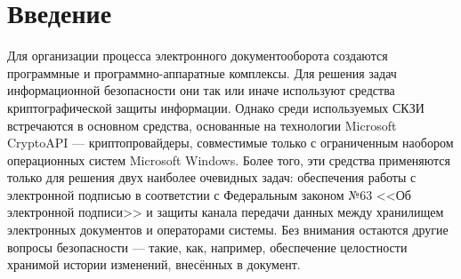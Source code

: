 \section{Введение} \label{research_introduction}



\vspace{\baselineskip}
Для организации процесса электронного документооборота создаются программные и программно-аппаратные комплексы. Для решения задач информационной безопасности они так или иначе используют средства криптографической защиты информации. Однако среди используемых СКЗИ встречаются в основном средства, основанные на технологии Microsoft CryptoAPI --- криптопровайдеры, совместимые только с ограниченным наобором операционных систем Microsoft Windows. Более того, эти средства применяются только для решения двух наиболее очевидных задач: обеспечения работы с электронной подписью в соответстии с Федеральным законом №63 <<Об электронной подписи>> и защиты канала передачи данных между хранилищем электронных документов и операторами системы. Без внимания остаются другие вопросы безопасности --- такие, как, например, обеспечение целостности хранимой истории изменений, внесённых в документ.

